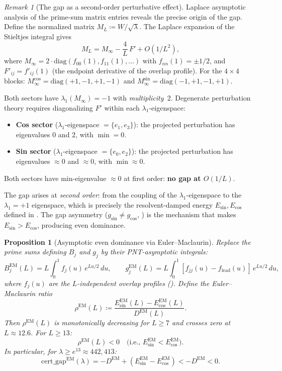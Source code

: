 \documentclass[12pt,a4paper]{article}
\newtheorem{proposition}[theorem]{Proposition}
\theoremstyle{definition}
\theoremstyle{remark}
\newtheorem{remark}[theorem]{Remark}
\begin{document}
\begin{remark}[The gap as a second-order perturbative effect]
\label{rem:gap-source}
Laplace asymptotic analysis of the prime-sum matrix entries reveals the precise origin of the gap. Define the normalized matrix $M_L \coloneqq W / \sqrt{\lambda}$. The Laplace expansion of the Stieltjes integral gives
\[
  M_L = M_\infty - \frac{4}{L}\,F' + O(1/L^2),
\]
where $M_\infty = 2 \cdot \mathrm{diag}(f_{00}(1), f_{11}(1), \ldots)$ with $f_{nn}(1) = \pm 1/2$, and $F'_{ij} = f'_{ij}(1)$ (the endpoint derivative of the overlap profile). For the $4 \times 4$ blocks: $M_\infty^{\cos} = \mathrm{diag}(+1,-1,+1,-1)$ and $M_\infty^{\sin} = \mathrm{diag}(-1,+1,-1,+1)$.

Both sectors have $\lambda_1(M_\infty) = -1$ with \emph{multiplicity~$2$}. Degenerate perturbation theory requires diagonalizing $F'$ within each $\lambda_1$-eigenspace:
\begin{itemize}
  \item \textbf{Cos sector} ($\lambda_1$-eigenspace $= \{e_1, e_3\}$): the projected perturbation has eigenvalues $0$ and $2$, with $\min = 0$.
  \item \textbf{Sin sector} ($\lambda_1$-eigenspace $= \{e_0, e_2\}$): the projected perturbation has eigenvalues $\approx 0$ and $\approx 0$, with $\min \approx 0$.
\end{itemize}
Both sectors have min-eigenvalue $\approx 0$ at first order: \textbf{no gap at $O(1/L)$}.

The gap arises at \emph{second order}: from the coupling of the $\lambda_1$-eigenspace to the $\lambda_1 = +1$ eigenspace, which is precisely the resolvent-damped energy $E_{\sin}, E_{\cos}$ defined in . The gap asymmetry ($g_{\sin} \neq g_{\cos}$, ) is the mechanism that makes $E_{\sin} > E_{\cos}$, producing even dominance.
\end{remark}

\begin{proposition}[Asymptotic even dominance via Euler--Maclaurin]
\label{prop:euler-maclaurin}
Replace the prime sums defining $B_j$ and $g_j$ by their PNT-asymptotic integrals:
\[
  B_j^{\mathrm{EM}}(L) = L\!\int_0^1 f_j(u)\,e^{Lu/2}\,du, \qquad
  g_j^{\mathrm{EM}}(L) = L\!\int_0^1 [f_{jj}(u) - f_{\mathrm{lead}}(u)]\,e^{Lu/2}\,du,
\]
where $f_j(u)$ are the $L$-independent overlap profiles (). Define the Euler--Maclaurin ratio
\[
  \rho^{\mathrm{EM}}(L) \coloneqq \frac{E_{\sin}^{\mathrm{EM}}(L) - E_{\cos}^{\mathrm{EM}}(L)}{D^{\mathrm{EM}}(L)}.
\]
Then $\rho^{\mathrm{EM}}(L)$ is monotonically decreasing for $L \geq 7$ and crosses zero at $L \approx 12.6$. For $L \geq 13$:
\[
  \rho^{\mathrm{EM}}(L) < 0 \quad\text{(i.e., } E_{\sin}^{\mathrm{EM}} < E_{\cos}^{\mathrm{EM}}\text{)}.
\]
In particular, for $\lambda \geq e^{13} \approx 442{,}413$:
\[
  \mathrm{cert\_gap}^{\mathrm{EM}}(\lambda) = -D^{\mathrm{EM}} + (E_{\sin}^{\mathrm{EM}} - E_{\cos}^{\mathrm{EM}}) < -D^{\mathrm{EM}} < 0.
\]
\end{proposition}
\end{document}
